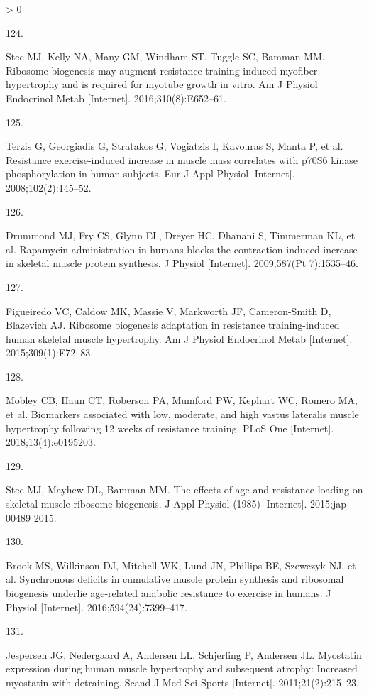\documentclass[twoside,10pt]{gihclass} %
\newlength{\cslhangindent}
\newlength{\csllabelwidth}
\newenvironment{CSLReferences}[3] %
 {%
  \setlength{\parindent}{0pt}
  \ifodd #1 \everypar{\setlength{\hangindent}{\cslhangindent}}\ignorespaces\fi
  \ifnum #2 > 0
  \setlength{\parskip}{#2\baselineskip}
  \fi
 }%
 {}
\newcommand{\CSLLeftMargin}[1]{\parbox[t]{\maxof{\widthof{#1}}{\csllabelwidth}}{#1}}
\newcommand{\CSLRightInline}[1]{\parbox[t]{\linewidth}{#1}}
\begin{document}
\begin{CSLReferences}{0}{0}
\leavevmode\hypertarget{ref-RN1755}{}%
\CSLLeftMargin{124. }
\CSLRightInline{Stec MJ, Kelly NA, Many GM, Windham ST, Tuggle SC, Bamman MM. Ribosome biogenesis may augment resistance training-induced myofiber hypertrophy and is required for myotube growth in vitro. Am J Physiol Endocrinol Metab {[}Internet{]}. 2016;310(8):E652--61. }

\leavevmode\hypertarget{ref-RN785}{}%
\CSLLeftMargin{125. }
\CSLRightInline{Terzis G, Georgiadis G, Stratakos G, Vogiatzis I, Kavouras S, Manta P, et al. Resistance exercise-induced increase in muscle mass correlates with p70S6 kinase phosphorylation in human subjects. Eur J Appl Physiol {[}Internet{]}. 2008;102(2):145--52. }

\leavevmode\hypertarget{ref-RN780}{}%
\CSLLeftMargin{126. }
\CSLRightInline{Drummond MJ, Fry CS, Glynn EL, Dreyer HC, Dhanani S, Timmerman KL, et al. Rapamycin administration in humans blocks the contraction-induced increase in skeletal muscle protein synthesis. J Physiol {[}Internet{]}. 2009;587(Pt 7):1535--46. }

\leavevmode\hypertarget{ref-RN1644}{}%
\CSLLeftMargin{127. }
\CSLRightInline{Figueiredo VC, Caldow MK, Massie V, Markworth JF, Cameron-Smith D, Blazevich AJ. Ribosome biogenesis adaptation in resistance training-induced human skeletal muscle hypertrophy. Am J Physiol Endocrinol Metab {[}Internet{]}. 2015;309(1):E72--83. }

\leavevmode\hypertarget{ref-RN2055}{}%
\CSLLeftMargin{128. }
\CSLRightInline{Mobley CB, Haun CT, Roberson PA, Mumford PW, Kephart WC, Romero MA, et al. Biomarkers associated with low, moderate, and high vastus lateralis muscle hypertrophy following 12 weeks of resistance training. PLoS One {[}Internet{]}. 2018;13(4):e0195203. }

\leavevmode\hypertarget{ref-RN1656}{}%
\CSLLeftMargin{129. }
\CSLRightInline{Stec MJ, Mayhew DL, Bamman MM. The effects of age and resistance loading on skeletal muscle ribosome biogenesis. J Appl Physiol (1985) {[}Internet{]}. 2015;jap 00489 2015. }

\leavevmode\hypertarget{ref-RN1809}{}%
\CSLLeftMargin{130. }
\CSLRightInline{Brook MS, Wilkinson DJ, Mitchell WK, Lund JN, Phillips BE, Szewczyk NJ, et al. Synchronous deficits in cumulative muscle protein synthesis and ribosomal biogenesis underlie age-related anabolic resistance to exercise in humans. J Physiol {[}Internet{]}. 2016;594(24):7399--417. }

\leavevmode\hypertarget{ref-RN2208}{}%
\CSLLeftMargin{131. }
\CSLRightInline{Jespersen JG, Nedergaard A, Andersen LL, Schjerling P, Andersen JL. Myostatin expression during human muscle hypertrophy and subsequent atrophy: Increased myostatin with detraining. Scand J Med Sci Sports {[}Internet{]}. 2011;21(2):215--23. }


\end{CSLReferences}
\end{document}
